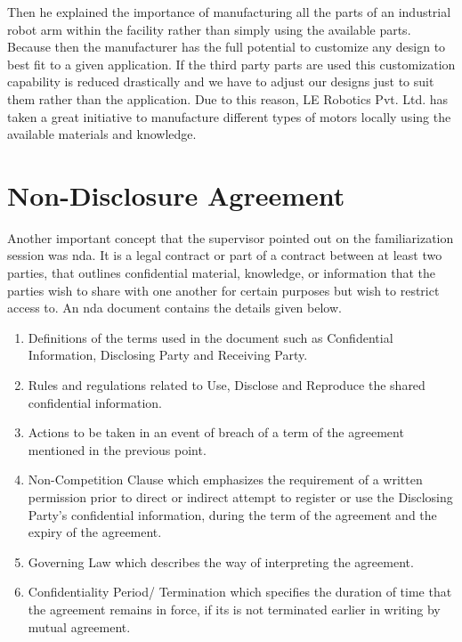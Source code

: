 \documentclass[a4paper,12pt]{report}
\begin{document}
Then he explained the importance of manufacturing all the parts of an industrial robot arm within the facility rather than simply using the available parts. Because then the manufacturer has the full potential to customize any design to best fit to a given application. If the third party parts are used this customization capability is reduced drastically and we have to adjust our designs just to suit them rather than the application. Due to this reason, LE Robotics Pvt. Ltd. has taken a great initiative to manufacture different types of motors locally using the available materials and knowledge.

\section{Non-Disclosure Agreement}

Another important concept that the supervisor pointed out on the familiarization session was \ac{nda}. It is a legal contract or part of a
contract between at least two parties, that outlines confidential material, knowledge, or information that the parties wish to share with one another for certain purposes but wish to restrict access to\cite{nda}. An \ac{nda} document contains the details given below.

\begin{enumerate}
	\item Definitions of the terms used in the document such as Confidential Information, Disclosing Party and Receiving Party.
	
	\item Rules and regulations related to Use, Disclose and Reproduce the shared confidential information.
	
	\item Actions to be taken in an event of breach of a term of the agreement mentioned in the previous point.
	
	\item Non-Competition Clause which emphasizes the requirement	of a written permission prior to	direct or indirect attempt to register	or use the Disclosing Party’s	confidential information, during the	term of the agreement and the expiry of the agreement.
	
	\item Governing Law which describes the way of interpreting the agreement.
	
	\item Confidentiality Period/ Termination which specifies the duration of time	that the agreement remains in	force, if its is not terminated earlier	in writing by mutual agreement.
\end{enumerate}
\end{document}
